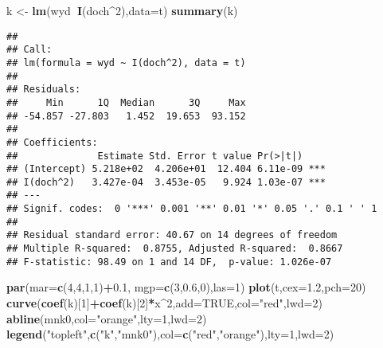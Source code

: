 \documentclass[polish,]{book}
\newenvironment{Shaded}{\begin{snugshade}}{\end{snugshade}}
\newcommand{\DataTypeTok}[1]{\textcolor[rgb]{0.13,0.29,0.53}{#1}}
\newcommand{\DecValTok}[1]{\textcolor[rgb]{0.00,0.00,0.81}{#1}}
\newcommand{\FloatTok}[1]{\textcolor[rgb]{0.00,0.00,0.81}{#1}}
\newcommand{\KeywordTok}[1]{\textcolor[rgb]{0.13,0.29,0.53}{\textbf{#1}}}
\newcommand{\NormalTok}[1]{#1}
\newcommand{\OperatorTok}[1]{\textcolor[rgb]{0.81,0.36,0.00}{\textbf{#1}}}
\newcommand{\OtherTok}[1]{\textcolor[rgb]{0.56,0.35,0.01}{#1}}
\newcommand{\StringTok}[1]{\textcolor[rgb]{0.31,0.60,0.02}{#1}}
\begin{document}
\begin{Shaded}
\begin{Highlighting}[]
\NormalTok{k <-}\StringTok{ }\KeywordTok{lm}\NormalTok{(wyd}\OperatorTok{~}\KeywordTok{I}\NormalTok{(doch}\OperatorTok{^}\DecValTok{2}\NormalTok{),}\DataTypeTok{data=}\NormalTok{t)}
\KeywordTok{summary}\NormalTok{(k)}
\end{Highlighting}
\end{Shaded}

\begin{verbatim}
## 
## Call:
## lm(formula = wyd ~ I(doch^2), data = t)
## 
## Residuals:
##     Min      1Q  Median      3Q     Max 
## -54.857 -27.803   1.452  19.653  93.152 
## 
## Coefficients:
##              Estimate Std. Error t value Pr(>|t|)    
## (Intercept) 5.218e+02  4.206e+01  12.404 6.11e-09 ***
## I(doch^2)   3.427e-04  3.453e-05   9.924 1.03e-07 ***
## ---
## Signif. codes:  0 '***' 0.001 '**' 0.01 '*' 0.05 '.' 0.1 ' ' 1
## 
## Residual standard error: 40.67 on 14 degrees of freedom
## Multiple R-squared:  0.8755, Adjusted R-squared:  0.8667 
## F-statistic: 98.49 on 1 and 14 DF,  p-value: 1.026e-07
\end{verbatim}

\begin{Shaded}
\begin{Highlighting}[]
\KeywordTok{par}\NormalTok{(}\DataTypeTok{mar=}\KeywordTok{c}\NormalTok{(}\DecValTok{4}\NormalTok{,}\DecValTok{4}\NormalTok{,}\DecValTok{1}\NormalTok{,}\DecValTok{1}\NormalTok{)}\OperatorTok{+}\FloatTok{0.1}\NormalTok{, }\DataTypeTok{mgp=}\KeywordTok{c}\NormalTok{(}\DecValTok{3}\NormalTok{,}\FloatTok{0.6}\NormalTok{,}\DecValTok{0}\NormalTok{),}\DataTypeTok{las=}\DecValTok{1}\NormalTok{)}
\KeywordTok{plot}\NormalTok{(t,}\DataTypeTok{cex=}\FloatTok{1.2}\NormalTok{,}\DataTypeTok{pch=}\DecValTok{20}\NormalTok{)}
\KeywordTok{curve}\NormalTok{(}\KeywordTok{coef}\NormalTok{(k)[}\DecValTok{1}\NormalTok{]}\OperatorTok{+}\KeywordTok{coef}\NormalTok{(k)[}\DecValTok{2}\NormalTok{]}\OperatorTok{*}\NormalTok{x}\OperatorTok{^}\DecValTok{2}\NormalTok{,}\DataTypeTok{add=}\OtherTok{TRUE}\NormalTok{,}\DataTypeTok{col=}\StringTok{"red"}\NormalTok{,}\DataTypeTok{lwd=}\DecValTok{2}\NormalTok{)}
\KeywordTok{abline}\NormalTok{(mnk0,}\DataTypeTok{col=}\StringTok{"orange"}\NormalTok{,}\DataTypeTok{lty=}\DecValTok{1}\NormalTok{,}\DataTypeTok{lwd=}\DecValTok{2}\NormalTok{)}
\KeywordTok{legend}\NormalTok{(}\StringTok{"topleft"}\NormalTok{,}\KeywordTok{c}\NormalTok{(}\StringTok{"k"}\NormalTok{,}\StringTok{"mnk0"}\NormalTok{),}\DataTypeTok{col=}\KeywordTok{c}\NormalTok{(}\StringTok{"red"}\NormalTok{,}\StringTok{"orange"}\NormalTok{),}\DataTypeTok{lty=}\DecValTok{1}\NormalTok{,}\DataTypeTok{lwd=}\DecValTok{2}\NormalTok{)}
\end{Highlighting}
\end{Shaded}
\end{document}
